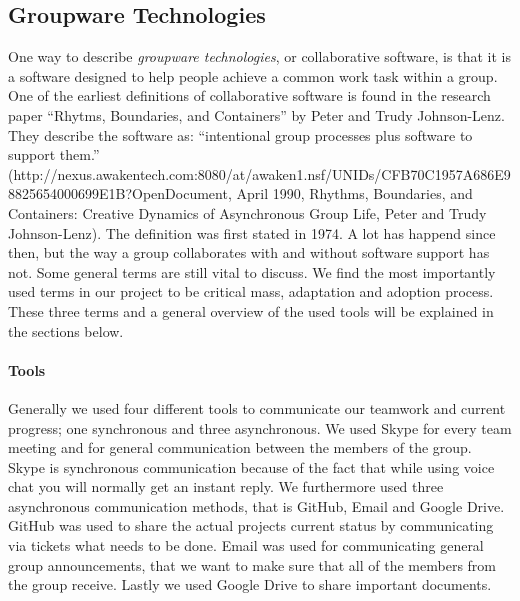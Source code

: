 \subsection{Groupware Technologies} \label{subsec:groupwaretechnologies}
One way to describe \textit{groupware technologies}, or collaborative software, is that it is a software designed to help people achieve a common work task within a group. One of the earliest definitions of collaborative software is found in the research paper ``Rhytms, Boundaries, and Containers'' by Peter and Trudy Johnson-Lenz. They describe the software as: ``intentional group processes plus software to support them.'' (http://nexus.awakentech.com:8080/at/awaken1.nsf/UNIDs/CFB70C1957A686E98825654000699E1B?OpenDocument, April 1990, Rhythms, Boundaries, and Containers: Creative Dynamics of Asynchronous Group Life, Peter and Trudy Johnson-Lenz). The definition was first stated in 1974. A lot has happend since then, but the way a group collaborates with and without software support has not. Some general terms are still vital to discuss. We find the most importantly used terms in our project to be critical mass, adaptation and adoption process. These three terms and a general overview of the used tools will be explained in the sections below.

\paragraph{Tools} \label{par:tools}
Generally we used four different tools to communicate our teamwork and current progress; one synchronous and three asynchronous. We used Skype for every team meeting and for general communication between the members of the group. Skype is synchronous communication because of the fact that while using voice chat you will normally get an instant reply. We furthermore used three asynchronous communication methods, that is GitHub, Email and Google Drive. GitHub was used to share the actual projects current status by communicating via tickets what needs to be done. Email was used for communicating general group announcements, that we want to make sure that all of the members from the group receive. Lastly we used Google Drive to share important documents.  

